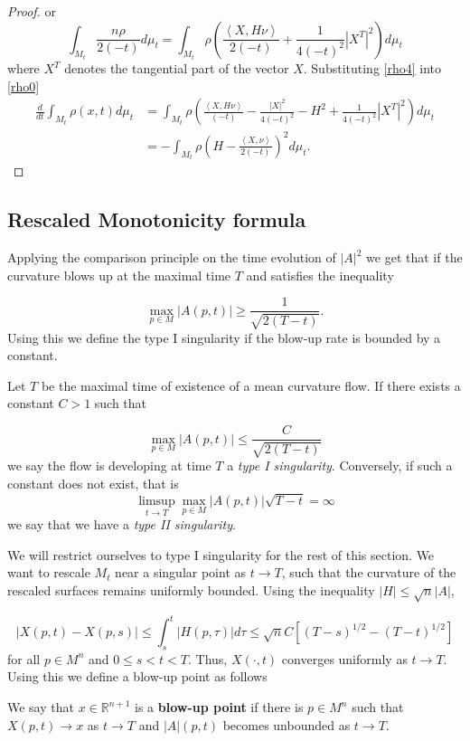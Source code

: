 \begin{proof}
or 
\begin{equation}
\int_{M_{t}}\frac{n\rho}{2(-t)} d \mu_{t} = \int_{M_{t}} \rho \left(  \frac{\left< X,H \nu \right>}{2(-t)} + \frac{1}{4(-t)^2}|X^T|^2 \right)d \mu_{t}\label{rho4}
\end{equation}
where $ X^{T} $ denotes the tangential part of the vector $ X $. Substituting \cref{rho4} into \cref{rho0}
\begin{align*}
\frac{d}{dt} \int_{M_{t}}\rho(x,t)d \mu_{t}  &=  \int_{M_{t}}\rho\left(\frac{\left< X,H \nu\right>}{(-t)}- \frac{|X|^{2}}{4(-t)^{2}} -H^{2}+ \frac{1}{4(-t)^2}|X^T|^2\right)d \mu_{t}\\ 
& = -\int_{M_{t}} \rho \left( H - \frac{\left< X, \nu \right>}{2(-t)} \right)^{2} d \mu_{t}.
\end{align*}
\end{proof}

\subsection{Rescaled Monotonicity formula}\label{Type1singularity}

Applying the comparison principle on the time evolution of $ |A|^{2} $ we get that if the curvature blows up at the maximal time $ T $  and satisfies the inequality

\[ \max_{p \in M}|A(p,t)| \ge \frac{1}{\sqrt{2(T-t)}}.\]
Using this we define the type I singularity if the blow-up rate is bounded by a constant. 
\begin{defn}
Let $ T $ be the maximal time of existence of a mean curvature flow. If there exists a constant $ C >1 $ such that 

\[ \max_{p \in M}|A(p,t)| \le \frac{C}{\sqrt{2(T-t)}} \]
we say the flow is developing at time $ T $ a \textit{type I singularity}. Conversely, if such a constant does not exist, that is 
\[ \limsup_{t \to T} \max_{p \in M}|A(p,t)|\sqrt{T-t} = \infty \]
we say that we have a \textit{type II singularity}.
\end{defn}

 We will restrict ourselves to type I singularity for the rest of this section. We want to rescale $M_t$ near a singular point as $t \rightarrow T$, such that the curvature of the rescaled surfaces remains uniformly bounded. Using the inequality $ |H| \le \sqrt{n}|A| $, 

$$
|X(p, t)-X(p, s)| \leq \int_s^t|H(p, \tau)| d \tau \leq \sqrt{n}C\left[(T-s)^{1 / 2}-(T-t)^{1 / 2}\right]
$$
for all $p \in M^n$ and $0 \leq s<t<T$. Thus, $X(\cdot, t)$ converges uniformly as $t \rightarrow T$. Using this we define a blow-up point as follows
\begin{defn}
    We say that $x \in \mathbb{R}^{n+1}$ is a \textbf{blow-up point}  if there is $p \in M^n$ such that $X(p, t) \rightarrow x$ as $t \rightarrow T$ and $|A|(p, t)$ becomes unbounded as $t \rightarrow T$.
\end{defn}

